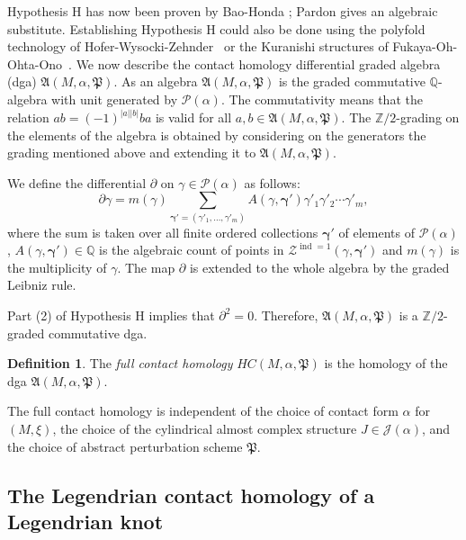 \documentclass[JEP,XML,SOM,Unicode,NoFloatCountersInSection]{cedram}
\let\mathcal\mathscr
\theoremstyle{plain}
\theoremstyle{definition}
\newtheorem{defn}[thm]{Definition}
\numberwithin{equation}{subsection}
\newcommand{\QQ}{\mathbb{Q}}
\newcommand{\bdry}{\partial}
\let\op\operatorname
\let\bs\boldsymbol
\begin{document}
Hypothesis H has now been proven by Bao-Honda \cite{BH}; Pardon \cite{Pa1,Pa2} gives an algebraic substitute. Establishing Hypothesis H could also be done using the polyfold technology of Hofer-Wysocki-Zehnder~\cite{HWZ2} or the Kuranishi structures of Fukaya-Oh-Ohta-Ono~\cite{FO3}. We now describe the contact homology differential graded algebra (dga) $\mathfrak{A}(M,\alpha, {\mathfrak P})$. As an algebra $\mathfrak{A}(M,\alpha, {\mathfrak P})$ is the graded commutative $\mathbb{Q}$-algebra with unit generated by $\mathcal{P}(\alpha)$. The commutativity means that the relation $a b = (-1)^{|a||b|}ba$ is valid for all $a,b \in \mathfrak{A}(M,\alpha,{\mathfrak P})$. The $\mathbb{Z}/2$-grading on the elements of the algebra is obtained by considering on the generators the grading mentioned above and extending it to $\mathfrak{A}(M,\alpha, {\mathfrak P})$.

We define the differential $\bdry$ on $\gamma\in \mathcal{P}(\alpha)$ as follows:
\begin{equation}
\bdry \gamma = m(\gamma) \sum_{\bs{\gamma}'=(\gamma'_1,\dots,\gamma'_m)} A(\gamma,\bs\gamma') \gamma'_1 \gamma'_2\cdots \gamma'_m,
\end{equation}
where the sum is taken over all finite ordered collections $\bs\gamma'$ of elements of $\mathcal{P}(\alpha)$, $A(\gamma,\bs\gamma')\in \QQ$ is the algebraic count of points in $\mathcal{Z}^{\op{ind}=1}(\gamma,\bs\gamma')$ and $m(\gamma)$ is the multiplicity of $\gamma$. The map $\bdry$ is extended to the whole algebra by the graded Leibniz rule.

Part (2) of Hypothesis H implies that $\bdry^2=0$. Therefore, $\mathfrak{A}(M,\alpha,{\mathfrak P})$ is a $\mathbb{Z}/2$-gra\-ded commutative dga.

\begin{defn}
The {\em full contact homology} $HC(M,\alpha,{\mathfrak P})$ is the homology of the dga $\mathfrak{A}(M,\alpha,{\mathfrak P})$.
\end{defn}

The full contact homology is independent of the choice of contact form $\alpha$ for $(M,\xi)$, the choice of the cylindrical almost complex structure $J\in \mathcal{J}(\alpha)$, and the choice of abstract perturbation scheme ${\mathfrak P}$.

\subsection{The Legendrian contact homology of a Legendrian knot}
\end{document}
